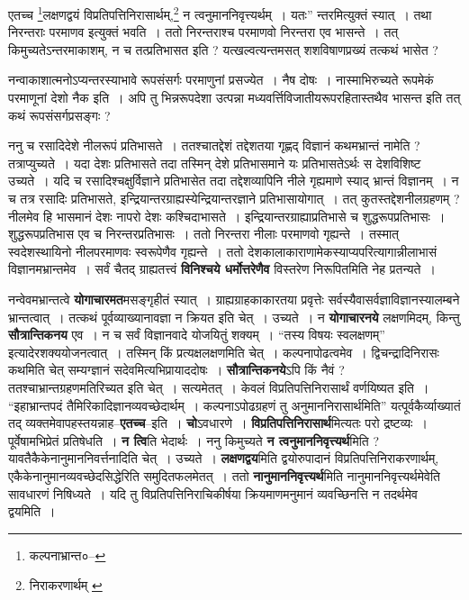 \documentclass[article,12pt,a4paper]{memoir}
\begin{document}
	एतच्च \footnote{कल्पनाभ्रान्त०--\cite{dp-msD-n}}लक्षणद्वयं विप्रतिपत्तिनिरासार्थम्,\footnote{निराकरणार्थम् \cite{dp-msA} \cite{dp-msC} \cite{dp-edP} \cite{dp-edE} \cite{dp-edH} \cite{dp-edN}} न त्वनुमाननिवृत्त्यर्थम् । यतः” न्तरमित्युक्तं स्यात् । तथा निरन्तराः परमाणव इत्युक्तं भवति । ततो निरन्तराश्च परमाणवो निरन्तरा एव भासन्ते । तत् किमुच्यतेऽन्तरमाकाशम्, न च तत्प्रतिभासत इति ? यत्खल्वत्यन्तमसत् शशविषाणप्रख्यं तत्कथं भासेत ?
	\pend
      

	  \pstart नन्वाकाशात्मनोऽप्यन्तरस्याभावे रूपसंसर्गः परमाणुनां प्रसज्येत । नैष दोषः । नास्माभिरुच्यते रूपमेकं परमाणूनां देशो नैक इति । अपि तु भिन्नरूपदेशा उत्पन्ना मध्यवर्त्तिविजातीयरूपरहितास्तथैव भासन्त इति तत् कथं रूपसंसर्गप्रसङ्गः ?
	\pend
      

	  \pstart ननु च रसादिदेशे नीलरूपं प्रतिभासते । ततश्चातद्देशं तद्देशतया गृह्णद् विज्ञानं कथमभ्रान्तं नामेति ? तत्राप्युच्यते । यदा देशः प्रतिभासते तदा तस्मिन् देशे प्रतिभासमाने यः प्रतिभासतेऽर्थः स देशविशिष्ट उच्यते । यदि च रसादिश्चक्षुर्विज्ञाने प्रतिभासेत तदा तद्देशव्यापिनि नीले गृह्यमाणे स्याद् भ्रान्तं विज्ञानम् । न च तत्र रसादिः प्रतिभासते, इन्द्रियान्तरग्राह्यस्येन्द्रियान्तरज्ञाने प्रतिभासायोगात् । तत् कुतस्तद्देशनीलग्रहणम् ? नीलमेव हि भासमानं देशः नापरो देशः कश्चिदाभासते । इन्द्रियान्तरग्राह्याप्रतिभासे च शुद्धरूपप्रतिभासः । शुद्धरूपप्रतिभास एव च निरन्तरप्रतिभासः । ततो निरन्तरा नीलाः परमाणवो गृह्यन्ते । तस्मात् स्वदेशस्थायिनो नीलपरमाणवः स्वरूपेणैव गृह्यन्ते । ततो देशकालाकाराणामेकस्याप्यपरित्यागान्नीलाभासं विज्ञानमभ्रान्तमेव । सर्वं चैतद् ग्राह्यतत्त्वं \textbf{विनिश्चये धर्मोत्तरेणैव} विस्तरेण निरूपितमिति नेह प्रतन्यते ।
	\pend
      

	  \pstart नन्वेवमभ्रान्तत्वे \textbf{योगाचारमत}मसङ्गृहीतं स्यात् । ग्राह्यग्राहकाकारतया प्रवृत्तेः सर्वस्यैवासर्वज्ञाविज्ञानस्यालम्बने भ्रान्तत्वात् । तत्कथं पूर्वव्याख्यानावज्ञा न क्रियत इति चेत् । उच्यते । न \textbf{योगाचारनये} लक्षणमिदम्, किन्तु \textbf{सौत्रान्तिकनय} एव । न च सर्वं विज्ञानवादे योजयि\leavevmode{}तुं शक्यम् । “तस्य विषयः स्वलक्षणम्” इत्यादेरशक्ययोजनत्वात् । तस्मिन् किं प्रत्यक्षलक्षणमिति चेत् । कल्पनापोढत्वमेव । द्विचन्द्रादिनिरासः कथमिति चेत् सम्यग्ज्ञानं सदेवमित्यभिप्रायाददोषः । \textbf{सौत्रान्तिकनये}ऽपि किं नैवं ? ततश्चाभ्रान्तग्रहणमतिरिच्यत इति चेत् । सत्यमेतत् । केवलं विप्रतिपत्तिनिरासार्थं वर्णयिष्यत इति । “इहाभ्रान्तपदं तैमिरिकादिज्ञानव्यवच्छेदार्थम् । कल्पनाऽपोढग्रहणं तु अनुमाननिरासार्थमिति” यत्पूर्वकैर्व्याख्यातं तद् व्यक्तमेवापहस्तयन्नाह--\textbf{एतच्च}--इति । \textbf{चो}ऽवधारणे । \textbf{विप्रतिपत्तिनिरासार्थ}मित्यतः परो द्रष्टव्यः । पूर्वेषामभिप्रेतं प्रतिषेधति । \textbf{न त्वि}ति भेदार्थः । ननु किमुच्यते \textbf{न त्वनुमाननिवृत्त्यर्थ}मिति ? यावतैकैकेनानुमाननिवर्त्तनादिति चेत् । उच्यते । \textbf{लक्षणद्वय}मिति द्वयोरुपादानं विप्रतिपत्तिनिराकरणार्थम्, एकैकेनानुमानव्यवच्छेदसिद्धेरिति समुदितफलमेतत् । ततो \textbf{नानुमाननिवृत्त्यर्थ}मिति नानुमाननिवृत्त्यर्थमेवेति सावधारणं निषिध्यते । यदि तु विप्रतिपत्तिनिराचिकीर्षया क्रियमाणमनुमानं व्यवच्छिनत्ति न तदर्थमेव द्वयमिति ।
	\pend
      
\end{document}

